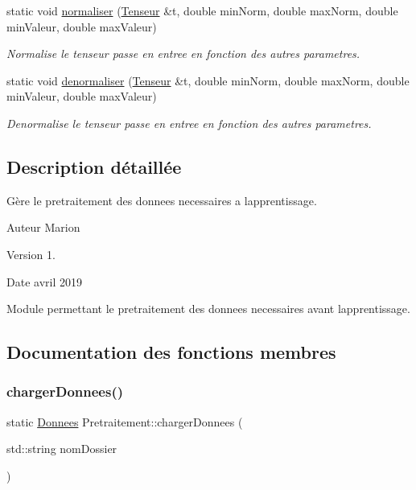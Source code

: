 \begin{DoxyCompactItemize}
static void \hyperlink{classPretraitement_a3d7be2ef2f1c6b0b8e3f1898110740bc}{normaliser} (\hyperlink{classTenseur}{Tenseur} \&t, double min\+Norm, double max\+Norm, double min\+Valeur, double max\+Valeur)
\begin{DoxyCompactList}\small\item\em Normalise le tenseur passe en entree en fonction des autres parametres. \end{DoxyCompactList}\item 
static void \hyperlink{classPretraitement_a68c5f7dc52d76fe0ff1f2794c4de40d7}{denormaliser} (\hyperlink{classTenseur}{Tenseur} \&t, double min\+Norm, double max\+Norm, double min\+Valeur, double max\+Valeur)
\begin{DoxyCompactList}\small\item\em Denormalise le tenseur passe en entree en fonction des autres parametres. \end{DoxyCompactList}\end{DoxyCompactItemize}


\subsection{Description détaillée}
Gère le pretraitement des donnees necessaires a l\textquotesingle{}apprentissage. 

\begin{DoxyAuthor}{Auteur}
Marion 
\end{DoxyAuthor}
\begin{DoxyVersion}{Version}
1. 
\end{DoxyVersion}
\begin{DoxyDate}{Date}
avril 2019
\end{DoxyDate}
Module permettant le pretraitement des donnees necessaires avant l\textquotesingle{}apprentissage. 

\subsection{Documentation des fonctions membres}
\mbox{\label{classPretraitement_a5f53fc5ecf4893d40577aceb269e97b5}} 
\subsubsection{\texorpdfstring{charger\+Donnees()}{chargerDonnees()}}
{\footnotesize\ttfamily static \hyperlink{classDonnees}{Donnees} Pretraitement\+::charger\+Donnees (\begin{DoxyParamCaption}\item[{std\+::string}]{nom\+Dossier }\end{DoxyParamCaption})\hspace{0.3cm}{\ttfamily [static]}}



